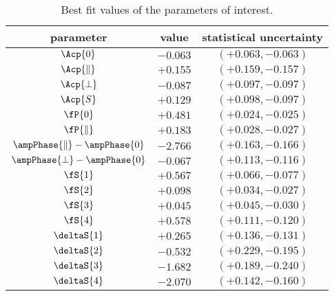 \begin{table}[!h]
  \center
  \begin{tabular}{c c c}
    \hline
     parameter & value & statistical uncertainty \\
     \hline
     $             \Acp{0}$ & $-0.063$ & $(+0.063,-0.063)$ \\
     $     \Acp{\parallel}$ & $+0.155$ & $(+0.159,-0.157)$ \\
     $         \Acp{\perp}$ & $-0.087$ & $(+0.097,-0.097)$ \\
     $             \Acp{S}$ & $+0.129$ & $(+0.098,-0.097)$ \\
     \hline
     $              \fP{0}$ & $+0.481$ & $(+0.024,-0.025)$ \\
     $      \fP{\parallel}$ & $+0.183$ & $(+0.028,-0.027)$ \\
     $\ampPhase{\parallel}-\ampPhase{0}$ & $-2.766$ & $(+0.163,-0.166)$ \\
     $    \ampPhase{\perp}-\ampPhase{0}$ & $-0.067$ & $(+0.113,-0.116)$ \\
     \hline
     $              \fS{1}$ & $+0.567$ & $(+0.066,-0.077)$ \\
     $              \fS{2}$ & $+0.098$ & $(+0.034,-0.027)$ \\
     $              \fS{3}$ & $+0.045$ & $(+0.045,-0.030)$ \\
     $              \fS{4}$ & $+0.578$ & $(+0.111,-0.120)$ \\
     $          \deltaS{1}$ & $+0.265$ & $(+0.136,-0.131)$ \\
     $          \deltaS{2}$ & $-0.532$ & $(+0.229,-0.195)$ \\
     $          \deltaS{3}$ & $-1.682$ & $(+0.189,-0.240)$ \\
     $          \deltaS{4}$ & $-2.070$ & $(+0.142,-0.160)$ \\
    \hline
  \end{tabular}
  \caption{\small Best fit values of the parameters of interest.}
  \label{bestFitResult}
\end{table}


